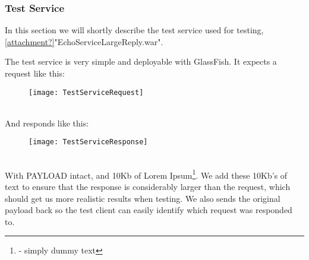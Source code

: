 \subsubsection{Test Service}\label{Testing:About:Service}
    In this section we will shortly describe the test service used for testing, \ref{attachment?}"EchoServiceLargeReply.war".

    The test service is very simple and deployable with GlassFish. It expects a request like this:
    \begin{figure}[h]
        \centering
        \texttt{[image: TestServiceRequest]}
        \label{fig:TestServiceRequest}
    \end{figure}
    \\
    And responds like this:
    \begin{figure}[h]
        \centering
        \texttt{[image: TestServiceResponse]}
        \label{fig:TestServiceResponse}
    \end{figure}
    \\
    With PAYLOAD intact, and 10Kb of Lorem Ipsum\footnote{ - simply dummy text}. We add these 10Kb's of text to ensure that the response is considerably larger than the request, which should get us more realistic results when testing. We also sends the original payload back so the test client can easily identify which request was responded to.